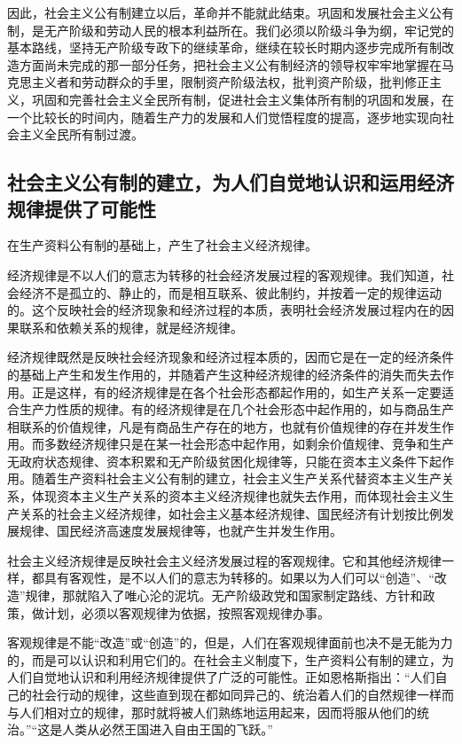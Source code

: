 \documentclass{book}
\begin{document}
因此，社会主义公有制建立以后，革命并不能就此结束。巩固和发展社会主义公有制，是无产阶级和劳动人民的根本利益所在。我们必须以阶级斗争为纲，牢记党的基本路线，坚持无产阶级专政下的继续革命，继续在较长时期内逐步完成所有制改造方面尚未完成的那一部分任务，把社会主义公有制经济的领导权牢牢地掌握在马克思主义者和劳动群众的手里，限制资产阶级法权，批判资产阶级，批判修正主义，巩固和完善社会主义全民所有制，促进社会主义集体所有制的巩固和发展，在一个比较长的时间内，随着生产力的发展和人们觉悟程度的提高，逐步地实现向社会主义全民所有制过渡。

\subsection{社会主义公有制的建立，为人们自觉地认识和运用经济规律提供了可能性}

在生产资料公有制的基础上，产生了社会主义经济规律。

经济规律是不以人们的意志为转移的社会经济发展过程的客观规律。我们知道，社会经济不是孤立的、静止的，而是相互联系、彼此制约，并按着一定的规律运动的。这个反映社会的经济现象和经济过程的本质，表明社会经济发展过程内在的因果联系和依赖关系的规律，就是经济规律。

经济规律既然是反映社会经济现象和经济过程本质的，因而它是在一定的经济条件的基础上产生和发生作用的，并随着产生这种经济规律的经济条件的消失而失去作用。正是这样，有的经济规律是在各个社会形态都起作用的，如生产关系一定要适合生产力性质的规律。有的经济规律是在几个社会形态中起作用的，如与商品生产相联系的价值规律，凡是有商品生产存在的地方，也就有价值规律的存在并发生作用。而多数经济规律只是在某一社会形态中起作用，如剩余价值规律、竞争和生产无政府状态规律、资本积累和无产阶级贫困化规律等，只能在资本主义条件下起作用。随着生产资料社会主义公有制的建立，社会主义生产关系代替资本主义生产关系，体现资本主义生产关系的资本主义经济规律也就失去作用，而体现社会主义生产关系的社会主义经济规律，如社会主义基本经济规律、国民经济有计划按比例发展规律、国民经济高速度发展规律等，也就产生并发生作用。

社会主义经济规律是反映社会主义经济发展过程的客观规律。它和其他经济规律一样，都具有客观性，是不以人们的意志为转移的。如果以为人们可以“创造”、“改造”规律，那就陷入了唯心沦的泥坑。无产阶级政党和国家制定路线、方针和政策，做计划，必须以客观规律为依据，按照客观规律办事。

客观规律是不能“改造”或“创造”的，但是，人们在客观规律面前也决不是无能为力的，而是可以认识和利用它们的。在社会主义制度下，生产资料公有制的建立，为人们自觉地认识和利用经济规律提供了广泛的可能性。正如恩格斯指出：“人们自己的社会行动的规律，这些直到现在都如同异己的、统治着人们的自然规律一样而与人们相对立的规律，那时就将被人们熟练地运用起来，因而将服从他们的统治。”“这是人类从必然王国进入自由王国的飞跃。”
\end{document}

